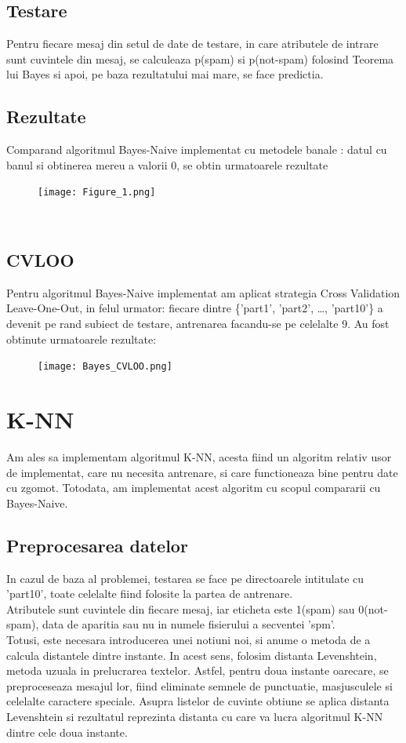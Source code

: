 \documentclass{article}
\begin{document}
\subsection{Testare}
Pentru fiecare mesaj din setul de date de testare, in care atributele de intrare sunt cuvintele din mesaj, se calculeaza p(spam) si p(not-spam) folosind Teorema lui Bayes si apoi, pe baza rezultatului mai mare, se face predictia. \\
\subsection{Rezultate}
    Comparand algoritmul Bayes-Naive implementat cu metodele banale : datul cu banul si obtinerea mereu a valorii 0, se obtin urmatoarele rezultate
    \begin{figure}[ht]
    \texttt{[image: Figure\_1.png]}
    \label{fig:result_image}
    \end{figure}

\\


\subsection{CVLOO}
    Pentru algoritmul Bayes-Naive implementat am aplicat strategia Cross Validation Leave-One-Out, in felul urmator: fiecare dintre \{'part1', 'part2', \dots , 'part10'\} a devenit pe rand subiect de testare, antrenarea facandu-se pe celelalte 9. Au fost obtinute urmatoarele rezultate:
    \newpage
    \begin{figure}[h]
    \texttt{[image: Bayes\_CVLOO.png]}
    \label{fig:bayes_cvloo}
    \end{figure}


\section{K-NN}
Am ales sa implementam algoritmul K-NN, acesta fiind un algoritm relativ usor de implementat, care nu necesita antrenare, si care functioneaza bine pentru date cu zgomot. Totodata, am implementat acest algoritm cu scopul compararii cu Bayes-Naive.
\subsection{Preprocesarea datelor}
In cazul de baza al problemei, testarea se face pe directoarele intitulate cu 'part10', toate celelalte fiind folosite la partea de antrenare. \\
Atributele sunt cuvintele din fiecare mesaj, iar eticheta este 1(spam) sau 0(not-spam), data de aparitia sau nu in numele fisierului a secventei 'spm'.\\
Totusi, este necesara introducerea unei notiuni noi, si anume o metoda de a calcula distantele dintre instante. In acest sens, folosim distanta Levenshtein, metoda uzuala in prelucrarea textelor. Astfel, pentru doua instante oarecare, se preproceseaza mesajul lor, fiind eliminate semnele de punctuatie, masjusculele si celelalte caractere speciale. Asupra listelor de cuvinte obtiune se aplica distanta Levenshtein si rezultatul reprezinta distanta cu care va lucra algoritmul K-NN dintre cele doua instante.
\end{document}
